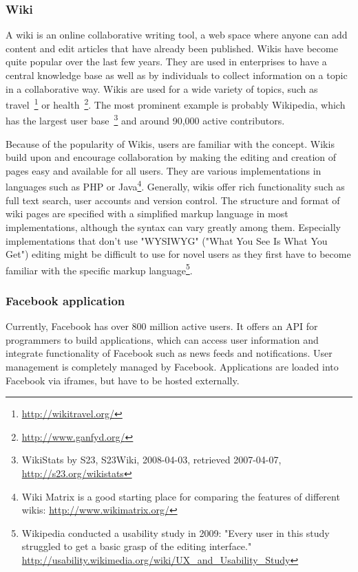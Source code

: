 \subsubsection{Wiki}
A wiki is an online collaborative writing tool, a web space where anyone can add content and edit articles that have already been published\cite{wiki_collaboration}. Wikis have become quite popular over the last few years. They are used in enterprises to have a central knowledge base as well as by individuals to collect information on a topic in a collaborative way. Wikis are used for a wide variety of topics, such as travel~\footnote{\url{http://wikitravel.org/}} or health~\footnote{\url{http://www.ganfyd.org/}}. The most prominent example is probably Wikipedia, which has the largest user base~\footnote{WikiStats by S23, S23Wiki, 2008-04-03, retrieved 2007-04-07, \url{http://s23.org/wikistats}} and around 90,000 active contributors.

Because of the popularity of Wikis, users are familiar with the concept. Wikis build upon and encourage collaboration by making the editing and creation of pages easy and available for all users. They are various implementations in languages such as PHP or Java\footnote{Wiki Matrix is a good starting place for comparing the features of different wikis: \url{http://www.wikimatrix.org/}}. Generally, wikis offer rich functionality such as full text search, user accounts and version control. The structure and format of wiki pages are specified with a simplified markup language in most implementations, although the syntax can vary greatly among them. Especially implementations that don't use "WYSIWYG" ("What You See Is What You Get") editing might be difficult to use for novel users as they first have to become familiar with the specific markup language\footnote{Wikipedia conducted a usability study in 2009: "Every user in this study struggled to get a basic grasp of the editing interface." \url{http://usability.wikimedia.org/wiki/UX_and_Usability_Study}}\cite{wikis_collaboration}.


\subsubsection{Facebook application}
Currently, Facebook has over 800 million active users. It offers an API for programmers to build applications, which can access user information and integrate functionality of Facebook such as news feeds and notifications. User management is completely managed by Facebook. Applications are loaded into Facebook via iframes, but have to be hosted externally.

